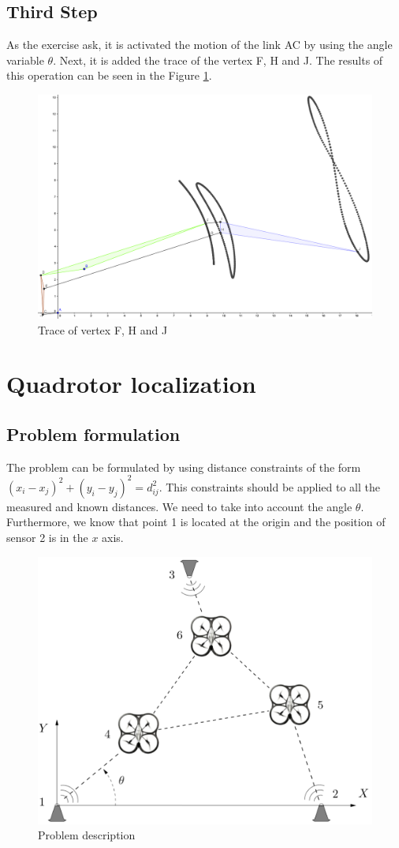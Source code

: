 \documentclass[paper=a4, fontsize=11pt]{scrartcl} %
\begin{document}
\subsection*{Third Step}
As the exercise ask, it is activated the motion of the link AC by using the angle variable $\theta$. Next, it is added the trace of the vertex F, H and J. The results of this operation can be seen in the Figure \ref{fig:wing_result}.
\begin{figure}[htb]
	\begin{center}
		\includegraphics[width=0.5\linewidth]{wing_result.png} 
	\caption{Trace of vertex F, H and J}
	\label{fig:wing_result}
	\end{center}
\end{figure}

\section{Quadrotor localization}
\subsection*{Problem formulation}
The problem  can be formulated by using distance constraints of the form $(x_i-x_j)^2+(y_i-y_j)^2 = d_{ij}^2$.  This constraints should be applied to all the measured and known distances. We need to take into account the angle $\theta$. Furthermore, we know that point 1 is located at the origin and the position of sensor 2 is in the $x$ axis.
\begin{figure}[H]
	\begin{center}
		\includegraphics[width=0.4\linewidth]{quad.PNG} 
	\caption{Problem description}
	\label{fig:quad}
	\end{center}
\end{figure}
\end{document}
